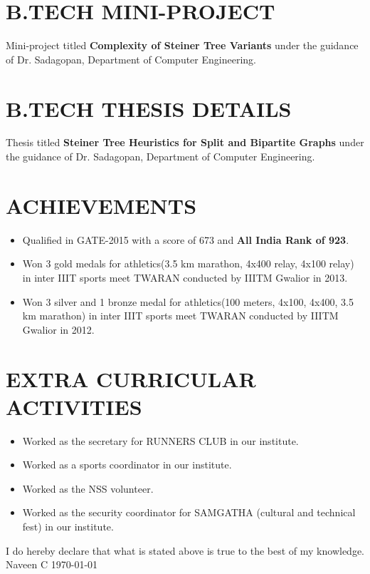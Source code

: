 \documentclass[paper=a4,fontsize=11pt]{scrartcl} %
\newcommand{\NewPart}[1]{\section*{\uppercase{#1}}}
\begin{document}
\NewPart{B.Tech mini-project}{}
Mini-project titled \textbf{Complexity of Steiner Tree Variants} under the guidance of Dr. Sadagopan, Department of Computer Engineering.
\NewPart{B.Tech thesis Details}{}
Thesis titled \textbf{Steiner Tree Heuristics for Split and Bipartite Graphs} under the guidance of Dr. Sadagopan, Department of Computer Engineering.
\\
\NewPart{Achievements}{}
\begin{itemize}
\item Qualified in GATE-2015 with a score of 673 and \textbf{All India Rank of 923}.
\item Won 3 gold medals for athletics(3.5 km marathon, 4x400 relay, 4x100 relay) in inter IIIT sports meet TWARAN conducted by IIITM Gwalior in 2013.
\item Won 3 silver and 1 bronze medal for athletics(100 meters, 4x100, 4x400, 3.5 km marathon) in inter IIIT sports meet TWARAN conducted by IIITM Gwalior in 2012.
\end{itemize}


\NewPart{Extra Curricular activities}{}
\begin{itemize}
\item Worked as the secretary for RUNNERS CLUB in our institute.
\item Worked as a sports coordinator in our institute. 
\item Worked as the NSS volunteer.
\item Worked as the security coordinator for SAMGATHA (cultural and technical fest) in our institute.
\end{itemize}


I do hereby declare that what is stated above is true to the best of my knowledge.
\vspace*{7mm}
\newline
Naveen C
\newline
\today
\end{document}
